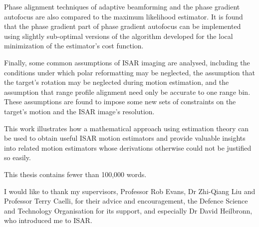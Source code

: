 Phase alignment techniques of adaptive beamforming and the phase gradient
autofocus are also compared to the maximum likelihood estimator.  It is
found that the phase gradient part of phase gradient autofocus can be
implemented using slightly sub-optimal versions of the algorithm developed
for the local minimization of the estimator's cost function.

Finally, some common assumptions of ISAR imaging are analysed, including
the conditions under which polar reformatting may be neglected, the
assumption that the target's rotation may be neglected during motion
estimation, and the assumption that range profile alignment need only be
accurate to one range bin.  These assumptions are found to impose some new
sets of constraints on the target's motion and the ISAR image's resolution.

This work illustrates how a mathematical approach using estimation theory
can be used to obtain useful ISAR motion estimators and provide valuable
insights into related motion estimators whose derivations otherwise could
not be justified so easily.


This thesis contains fewer than 100,000 words.


\vspace{4cm}


I would like to thank my supervisors, Professor Rob Evans, Dr Zhi-Qiang Liu
and Professor Terry Caelli, for their advice and encouragement, the Defence
Science and Technology Organisation for its support, and especially Dr David
Heilbronn, who introduced me to ISAR.
